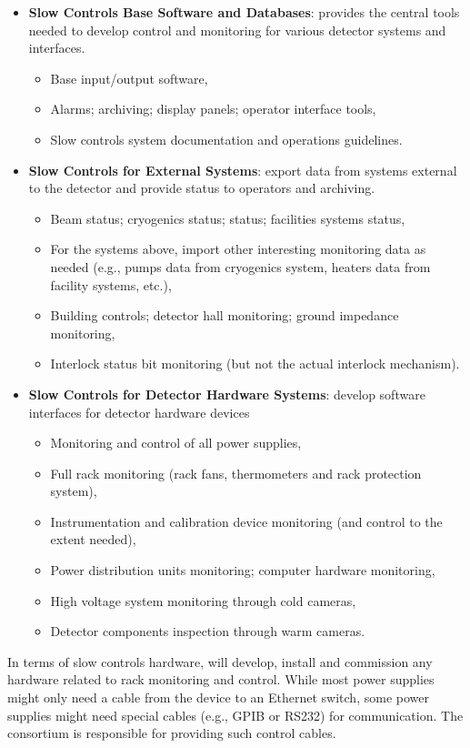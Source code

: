 \begin{itemize}
\item {\bf Slow Controls Base Software and Databases}: provides the central tools needed to develop control and monitoring for various detector systems and interfaces.
  \begin{itemize}
  \item Base input/output software,
  \item Alarms; archiving; display panels; operator interface tools,
  \item Slow controls system documentation and operations guidelines.
  \end{itemize}
\item {\bf Slow Controls for External Systems}: export data from systems external to the detector and provide status to operators and archiving.
  \begin{itemize}
  \item Beam status; cryogenics status;  status; facilities systems status,
  \item For the systems above, import other interesting monitoring data as needed (e.g., pumps data from cryogenics system, heaters data from facility systems, etc.),
  \item Building controls; detector hall monitoring; ground impedance monitoring,
  \item Interlock status bit monitoring (but not the actual interlock mechanism).
  \end{itemize}
\item {\bf Slow Controls for Detector Hardware Systems}: develop software interfaces for detector hardware devices
  \begin{itemize}
  \item Monitoring and control of all power supplies,
  \item Full rack monitoring (rack fans, thermometers and rack protection system),
  \item Instrumentation and calibration device monitoring (and control to the extent needed),
  \item Power distribution units monitoring; computer hardware monitoring,
  \item High voltage system monitoring through cold cameras,
  \item Detector components inspection through warm cameras.
  \end{itemize}
\end{itemize}

In terms of slow controls hardware,  will develop, install and
commission any hardware related to rack monitoring and control. While
most power supplies might only need a cable from the device to an
Ethernet switch, some power supplies might need special cables (e.g., 
GPIB or RS232) for communication. The  consortium is responsible for
providing such control cables.

